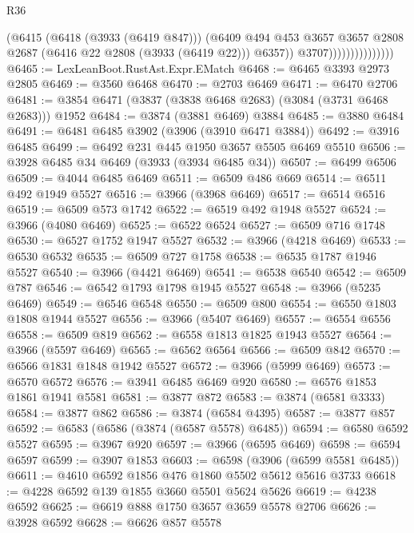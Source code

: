 \begin{lexlean}{R36}
\begin{coremodule}
                                  (@6415
                                    (@6418 (@3933 (@6419 @847)))
                                    (@6409
                                      @494
                                      @453
                                      @3657
                                      @3657
                                      @2808
                                      @2687
                                      (@6416 @22 @2808 (@3933 (@6419 @22)))
                                      @6357))
                                  @3707)))))))))))))))
@6465 := LexLeanBoot.RustAst.Expr.EMatch
@6468 := @6465 @3393 @2973 @2805
@6469 := @3560 @6468
@6470 := @2703 @6469
@6471 := @6470 @2706
@6481 := @3854 @6471 (@3837 (@3838 @6468 @2683) (@3084 (@3731 @6468 @2683))) @1952
@6484 := @3874 (@3881 @6469) @3884
@6485 := @3880 @6484
@6491 := @6481 @6485 @3902 (@3906 (@3910 @6471 @3884))
@6492 := @3916 @6485
@6499 := @6492 @231 @445 @1950 @3657 @5505 @6469 @5510
@6506 := @3928 @6485 @34 @6469 (@3933 (@3934 @6485 @34))
@6507 := @6499 @6506
@6509 := @4044 @6485 @6469
@6511 := @6509 @486 @669
@6514 := @6511 @492 @1949 @5527
@6516 := @3966 (@3968 @6469)
@6517 := @6514 @6516
@6519 := @6509 @573 @1742
@6522 := @6519 @492 @1948 @5527
@6524 := @3966 (@4080 @6469)
@6525 := @6522 @6524
@6527 := @6509 @716 @1748
@6530 := @6527 @1752 @1947 @5527
@6532 := @3966 (@4218 @6469)
@6533 := @6530 @6532
@6535 := @6509 @727 @1758
@6538 := @6535 @1787 @1946 @5527
@6540 := @3966 (@4421 @6469)
@6541 := @6538 @6540
@6542 := @6509 @787
@6546 := @6542 @1793 @1798 @1945 @5527
@6548 := @3966 (@5235 @6469)
@6549 := @6546 @6548
@6550 := @6509 @800
@6554 := @6550 @1803 @1808 @1944 @5527
@6556 := @3966 (@5407 @6469)
@6557 := @6554 @6556
@6558 := @6509 @819
@6562 := @6558 @1813 @1825 @1943 @5527
@6564 := @3966 (@5597 @6469)
@6565 := @6562 @6564
@6566 := @6509 @842
@6570 := @6566 @1831 @1848 @1942 @5527
@6572 := @3966 (@5999 @6469)
@6573 := @6570 @6572
@6576 := @3941 @6485 @6469 @920
@6580 := @6576 @1853 @1861 @1941 @5581
@6581 := @3877 @872
@6583 := @3874 (@6581 @3333)
@6584 := @3877 @862
@6586 := @3874 (@6584 @4395)
@6587 := @3877 @857
@6592 := @6583 (@6586 (@3874 (@6587 @5578) @6485))
@6594 := @6580 @6592 @5527
@6595 := @3967 @920
@6597 := @3966 (@6595 @6469)
@6598 := @6594 @6597
@6599 := @3907 @1853
@6603 := @6598 (@3906 (@6599 @5581 @6485))
@6611 := @4610 @6592 @1856 @476 @1860 @5502 @5612 @5616 @3733
@6618 := @4228 @6592 @139 @1855 @3660 @5501 @5624 @5626
@6619 := @4238 @6592
@6625 := @6619 @888 @1750 @3657 @3659 @5578 @2706
@6626 := @3928 @6592
@6628 := @6626 @857 @5578

\end{coremodule}
\end{lexlean}
